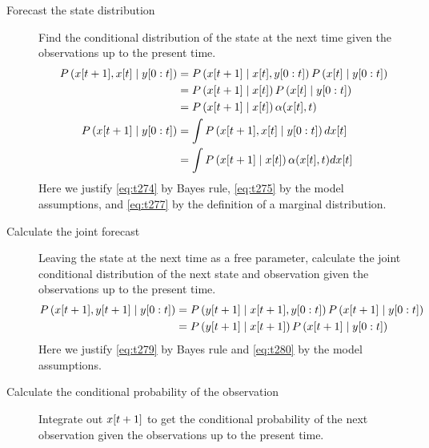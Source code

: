 \begin{description}
\item[Forecast the state distribution]  Find the
  conditional distribution of the state at the next time given the
  observations up to the present time.
\begin{align}
  \label{eq:t274}
  P\left({x}{[t+1]},{x}{[t]}\mid y[0:t] \right) &=
  P\left({x}{[t+1]}\mid {x}{[t]},y[0:t] \right)
  P\left({x}{[t]}\mid y[0:t] \right) \\
  \label{eq:t275}
  &= P\left({x}{[t+1]}\mid {x}{[t]} \right)
  P\left({x}{[t]}\mid y[0:t] \right) \\
  &= P\left({x}{[t+1]}\mid {x}{[t]} \right)
  \alpha({x}{[t]},t)\\
  \label{eq:t277}
  P\left({x}{[t+1]}\mid y[0:t] \right) &= \int
  P\left({x}{[t+1]},{x}{[t]}\mid y[0:t] \right) d{x}{[t]}\\
  \label{eq:IFore}
  &= \int P \left({x}{[t+1]}\mid {x}{[t]} \right)
  \alpha({x}{[t]},t) d{x}{[t]}
\end{align}
Here we justify \eqref{eq:t274} by Bayes rule, \eqref{eq:t275} by
the model assumptions, and \eqref{eq:t277} by the definition of a
marginal distribution.
\item[Calculate the joint forecast] Leaving the state at the next time
  as a free parameter, calculate the joint conditional distribution of
  the next state and observation given the observations up to the
  present time.
\begin{align}
  \label{eq:t279}
  P\left({x}{[t+1]},{y}{[t+1]}\mid y[0:t] \right) &=
  P\left({y}{[t+1]}\mid {x}{[t+1]},y[0:t] \right)
  P\left({x}{[t+1]}\mid y[0:t] \right) \\
  \label{eq:t280}
  &=P\left({y}{[t+1]}\mid {x}{[t+1]} \right)
  P\left({x}{[t+1]}\mid y[0:t] \right)
\end{align}
Here we justify \eqref{eq:t279} by Bayes rule and \eqref{eq:t280} by
the model assumptions.
\item[Calculate the conditional probability of the observation]
  Integrate out ${x}{[t+1]}$ to get the conditional probability of
  the next observation given the observations up to the present time.
\begin{equation}

\end{equation}
\end{description}
